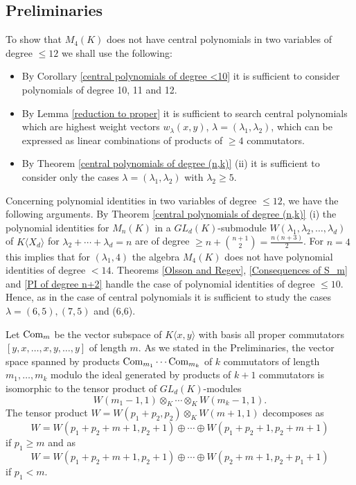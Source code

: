 \documentclass[12pt]{amsart}
\theoremstyle{definition}
\begin{document}
\subsection{Preliminaries}\label{preliminaries for two variables}
To show that $M_4(K)$ does not have central polynomials in two variables of degree $\leq 12$ we shall use the following:
\begin{itemize}
\item[(i)] By Corollary \ref{central polynomials of degree <10} it is sufficient to consider polynomials of degree 10, 11 and 12.
\item[(ii)] By Lemma \ref{reduction to proper} it is sufficient to search central polynomials which are highest weight vectors
$w_{\lambda}(x,y)$, $\lambda=(\lambda_1,\lambda_2)$, which can be expressed as linear combinations of products of $\geq 4$ commutators.
\item[(iii)] By Theorem \ref{central polynomials of degree (n,k)} (ii) it is sufficient to consider only the cases $\lambda=(\lambda_1,\lambda_2)$ with $\lambda_2\geq 5$.
\end{itemize}

Concerning polynomial identities in two variables of degree $\leq 12$, we have the following arguments. By Theorem \ref{central polynomials of degree (n,k)} (i)
the polynomial identities for $M_n(K)$ in a $GL_d(K)$-submodule $W(\lambda_1,\lambda_2,\ldots,\lambda_d)$ of $K\langle X_d\rangle$ for $\lambda_2+\cdots+\lambda_d=n$
are of degree $\displaystyle \geq n+\binom{n+1}{2}=\frac{n(n+3)}{2}$. For $n=4$ this implies that for $(\lambda_1,4)$ the algebra $M_4(K)$ does not have polynomial identities of degree $<14$.
Theorems \ref{Olsson and Regev}, \ref{Consequences of S_m} and \ref{PI of degree n+2} handle the case of polynomial identities of degree $\leq 10$.
Hence, as in the case of central polynomials it is sufficient to study the cases $\lambda=(6,5),(7,5)$ and (6,6).

Let $\text{\rm Com}_m$ be the vector subspace of $K\langle x,y\rangle$ with basis all proper commutators $[y,x,\ldots,x,y,\ldots,y]$ of length $m$.
As we stated in the Preliminaries, the vector space spanned by products $\text{\rm Com}_{m_1}\cdots \text{\rm Com}_{m_k}$
of $k$ commutators of length $m_1,\ldots,m_k$ modulo the ideal generated by products of $k+1$ commutators
is isomorphic to the tensor product of $GL_d(K)$-modules
\[
W(m_1-1,1)\otimes_K\cdots\otimes_KW(m_k-1,1).
\]
The tensor product $W=W(p_1+p_2,p_2)\otimes_KW(m+1,1)$ decomposes as
\[
W=W(p_1+p_2+m+1,p_2+1)\oplus\cdots\oplus W(p_1+p_2+1,p_2+m+1)
\]
if $p_1\geq m$ and as
\[
W=W(p_1+p_2+m+1,p_2+1)\oplus\cdots\oplus W(p_2+m+1,p_2+p_1+1)
\]
if $p_1<m$.
\end{document}

